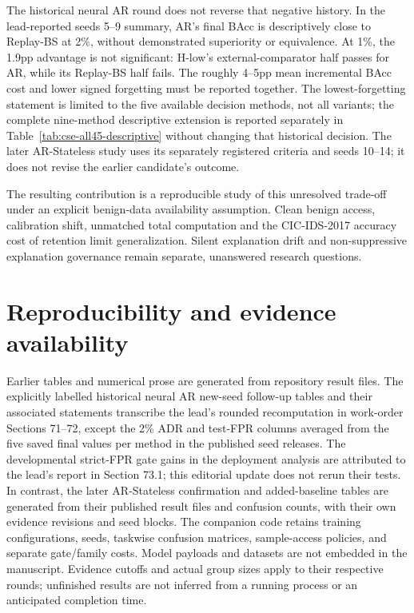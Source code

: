 \documentclass[10pt,twocolumn]{article}
\providecommand{\CSEConclusionText}{}
\begin{document}
\CSEConclusionText

The historical neural AR round does not reverse that negative history. In the lead-reported seeds 5--9 summary, AR's final BAcc is descriptively close to Replay-BS at 2\%, without demonstrated superiority or equivalence. At 1\%, the 1.9pp advantage is not significant: H-low's external-comparator half passes for AR, while its Replay-BS half fails. The roughly 4--5pp mean incremental BAcc cost and lower signed forgetting must be reported together. The lowest-forgetting statement is limited to the five available decision methods, not all variants; the complete nine-method descriptive extension is reported separately in Table~\ref{tab:cse-all45-descriptive} without changing that historical decision. The later AR-Stateless study uses its separately registered criteria and seeds 10--14; it does not revise the earlier candidate's outcome.

The resulting contribution is a reproducible study of this unresolved trade-off under an explicit benign-data availability assumption. Clean benign access, calibration shift, unmatched total computation and the CIC-IDS-2017 accuracy cost of retention limit generalization. Silent explanation drift and non-suppressive explanation governance remain separate, unanswered research questions.

\section*{Reproducibility and evidence availability}
Earlier tables and numerical prose are generated from repository result files. The explicitly labelled historical neural AR new-seed follow-up tables and their associated statements transcribe the lead's rounded recomputation in work-order Sections 71--72, except the 2\% ADR and test-FPR columns averaged from the five saved final values per method in the published seed releases. The developmental strict-FPR gate gains in the deployment analysis are attributed to the lead's report in Section 73.1; this editorial update does not rerun their tests. In contrast, the later AR-Stateless confirmation and added-baseline tables are generated from their published result files and confusion counts, with their own evidence revisions and seed blocks. The companion code retains training configurations, seeds, taskwise confusion matrices, sample-access policies, and separate gate/family costs. Model payloads and datasets are not embedded in the manuscript. Evidence cutoffs and actual group sizes apply to their respective rounds; unfinished results are not inferred from a running process or an anticipated completion time.
\end{document}
